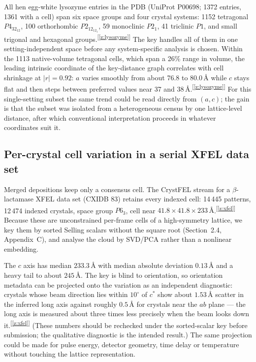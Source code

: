 \documentclass[11pt]{article}
\newcommand{\Ang}{\text{\AA}}
\newcommand{\chk}[1]{\textsuperscript{[\ref{#1}]}}
\begin{document}
All hen egg-white lysozyme entries in the PDB (UniProt P00698; 1372 entries, 1361 with a cell) span six space groups and four crystal systems: 1152 tetragonal $P4_32_12$, 100 orthorhombic $P2_12_12_1$, 59 monoclinic $P2_1$, 41 triclinic $P1$, and small trigonal and hexagonal groups.\chk{z:lysozyme} The key handles all of them in one setting-independent space before any system-specific analysis is chosen. Within the 1113 native-volume tetragonal cells, which span a 26\% range in volume, the leading intrinsic coordinate of the key-distance graph correlates with cell shrinkage at $|r|=0.92$: $a$ varies smoothly from about 76.8 to $80.0\,\Ang$ while $c$ stays flat and then steps between preferred values near 37 and $38\,\Ang$.\chk{z:lysozyme} For this single-setting subset the same trend could be read directly from $(a,c)$; the gain is that the subset was isolated from a heterogeneous census by one lattice-level distance, after which conventional interpretation proceeds in whatever coordinates suit it.

\subsection{Per-crystal cell variation in a serial XFEL data set}

Merged depositions keep only a consensus cell. The CrystFEL stream for a $\beta$-lactamase XFEL data set (CXIDB 83) retains every indexed cell: 14\,445 patterns, 12\,474 indexed crystals, space group $P6_3$, cell near $41.8\times41.8\times233\,\Ang$.\chk{z:xfel} Because these are unconstrained per-frame cells of a high-symmetry lattice, we key them by sorted Selling scalars without the square root (Section~2.4, Appendix~C), and analyse the cloud by SVD/PCA rather than a nonlinear embedding.

The $c$ axis has median $233.3\,\Ang$ with median absolute deviation $0.13\,\Ang$ and a heavy tail to about $245\,\Ang$. The key is blind to orientation, so orientation metadata can be projected onto the variation as an independent diagnostic: crystals whose beam direction lies within $10^\circ$ of $c^*$ show about $1.53\,\Ang$ scatter in the inferred long axis against roughly $0.5\,\Ang$ for crystals near the $ab$ plane --- the long axis is measured about three times less precisely when the beam looks down it.\chk{z:xfel} (These numbers should be rechecked under the sorted-scalar key before submission; the qualitative diagnostic is the intended result.) The same projection could be made for pulse energy, detector geometry, time delay or temperature without touching the lattice representation.
\end{document}
